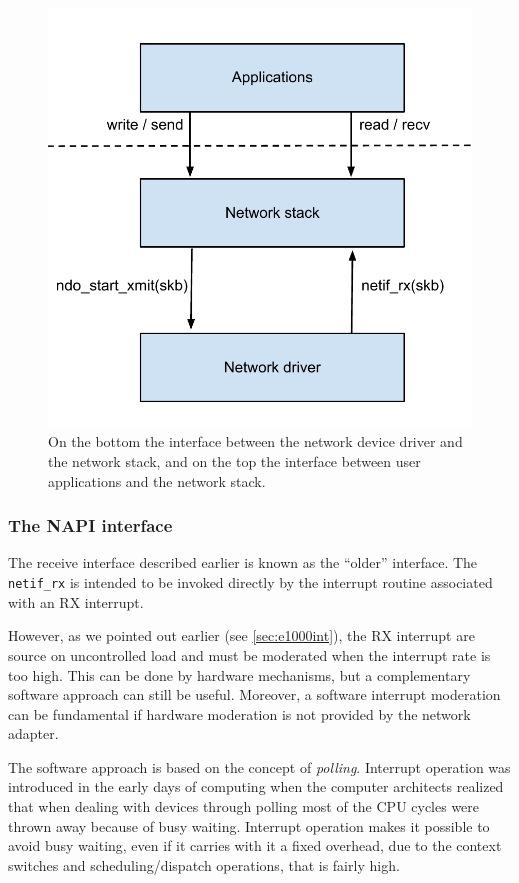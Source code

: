 \begin{figure}[bt]
\centering
\includegraphics[scale = 0.65]{linux-interface.pdf}
\caption{On the bottom the interface between the network device driver and the network stack, and on the top the interface between
user applications and the network stack.}
\label{fig:linux-interface}
\end{figure}


\subsubsection{The NAPI interface}
The receive interface described earlier is known as the ``older'' interface. The \texttt{netif\_rx} is intended to be invoked
directly by the interrupt routine associated with an RX interrupt.

However, as we pointed out earlier (see \ref{sec:e1000int}), the RX interrupt are source on uncontrolled load and must be moderated when
the interrupt rate is too high. This can be done by hardware mechanisms, but a complementary software approach can still be useful.
Moreover, a software interrupt moderation can be fundamental if hardware moderation is not provided by the network adapter.

\vspace{0.5cm}

The software approach is based on the concept of \emph{polling}. Interrupt operation was introduced in the early days of computing when
the computer architects realized that when dealing with devices through polling most of the CPU cycles were thrown away because of
busy waiting. Interrupt operation makes it possible to avoid busy waiting, even if it carries with it a fixed overhead, due to the
context switches and scheduling/dispatch operations, that is fairly high.

